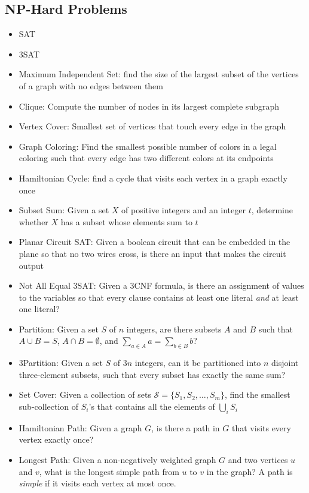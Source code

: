 \subsection{NP-Hard Problems}
\begin{itemize}
	\item SAT
	\item 3SAT
	\item Maximum Independent Set: find the size of the largest subset of the vertices of a graph with no edges between them
	\item Clique: Compute the number of nodes in its largest complete subgraph
	\item Vertex Cover: Smallest set of vertices that touch every edge in the graph
	\item Graph Coloring: Find the smallest possible number of colors in a legal coloring such that every edge has two different colors at its endpoints
	\item Hamiltonian Cycle: find a cycle that visits each vertex in a graph exactly once
	\item Subset Sum: Given a set $X$ of positive integers and an integer $t$, determine whether $X$ has a subset whose elements sum to $t$
	\item Planar Circuit SAT: Given a boolean circuit that can be embedded in the plane so that no two wires cross, is there an input that makes the circuit output 
	\item Not All Equal 3SAT: Given a 3CNF formula, is there an assignment of values to the variables so that every clause contains at least one  literal \emph{and} at least one  literal?
	\item Partition: Given a set $S$ of $n$ integers, are there subsets $A$ and $B$ such that $A \cup B = S$, $A \cap B = \emptyset$, and $\sum_{a \in A} a = \sum_{b \in B} b$?
	\item 3Partition: Given a set $S$ of $3n$ integers, can it be partitioned into $n$ disjoint three-element subsets, such that every subset has exactly the same sum?
	\item Set Cover: Given a collection of sets $\mathscr{S} = \{ S_1, S_2, \ldots, S_m \}$, find the smallest sub-collection of $S_i$'s that contains all the elements of $\bigcup_i S_i$
	\item Hamiltonian Path: Given a graph $G$, is there a path in $G$ that visits every vertex exactly once?
	\item Longest Path: Given a non-negatively weighted graph $G$ and two vertices $u$ and $v$, what is the longest simple path from $u$ to $v$ in the graph? A path is \emph{simple} if it visits each vertex at most once.

\end{itemize}

